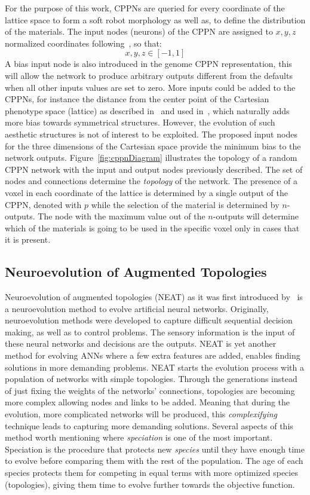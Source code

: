 \documentclass{sig-alternate}
\begin{document}
For the purpose of this work, CPPNs are queried for every coordinate of the lattice space to form a soft robot morphology as well as, to define the distribution of the materials. The input nodes (neurons) of the CPPN are assigned to $x,y,z$ normalized coordinates following~\cite{cheney2013unshackling}, so that:
\[x,y,z \in [-1,1]\]
A bias input node is also introduced in the genome CPPN representation, this will allow the network to produce arbitrary outputs different from the defaults when all other inputs values are set to zero. More inputs could be added to the CPPNs, for instance the distance from the center point of the Cartesian phenotype space (lattice) as described in~\cite{stanley2007compositional} and used in~\cite{cheney2013unshackling}, which naturally adds more bias towards symmetrical structures. However, the evolution of such aesthetic structures is not of interest to be exploited. The proposed input nodes for the three dimensions of the Cartesian space provide the minimum bias to the network outputs. Figure~\ref{fig:cppnDiagram} illustrates the topology of a random CPPN network with the input and output nodes previously described. The set of nodes and connections determine the \emph{topology} of the network. The presence of a voxel in each coordinate of the lattice is determined by a single output of the CPPN, denoted with $p$ while the selection of the material is determined by $n$-outputs. The node with the maximum value out of the $n$-outputs will determine which of the materials is going to be used in the specific voxel only in cases that it is present.


\subsection{Neuroevolution of Augmented Topologies}

Neuroevolution of augmented topologies (NEAT) as it was first introduced by~\cite{stanley2002evolving} is a neuroevolution method to evolve artificial neural networks. Originally, neuroevolution methods were developed to capture difficult sequential decision making, as well as to control problems. The sensory information is the input of these neural networks and decisions are the outputs. NEAT is yet another method for evolving ANNs where a few extra features are added, enables finding solutions in more demanding problems. NEAT starts the evolution process with a population of networks with simple topologies. Through the generations instead of just fixing the weights of the networks' connections, topologies are becoming more complex allowing nodes and links to be added. Meaning that during the evolution, more complicated networks will be produced, this \emph{complexifying} technique leads to capturing more demanding solutions. Several aspects of this method worth mentioning where \emph{speciation} is one of the most important. Speciation is the procedure that protects new \emph{species} until they have enough time to evolve before comparing them with the rest of the population. The age of each species protects them for competing in equal terms with more optimized species (topologies), giving them time to evolve further towards the objective function.
\end{document}
